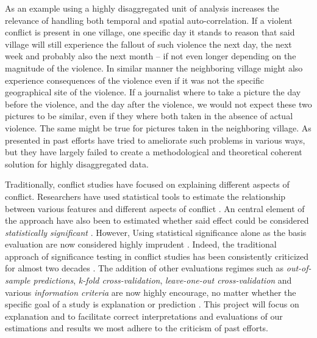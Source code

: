 \documentclass[a4paper]{article}
\begin{document}
As an example using a highly disaggregated unit of analysis increases the relevance of handling both temporal and spatial auto-correlation. If a violent conflict is present in one village, one specific day it stands to reason that said village will still experience the fallout of such violence the next day, the next week and probably also the next month -- if not even longer depending on the magnitude of the violence. In similar manner the neighboring village might also experience consequences of the violence even if it was not the specific geographical site of the violence. If a journalist where to take a picture the day before the violence, and the day after the violence, we would not expect these two pictures to be similar, even if they where both taken in the absence of actual violence. The same might be true for pictures taken in the neighboring village. As presented in \cite{SPECIALE} past efforts have tried to ameliorate such problems in various ways, but they have largely failed to create a methodological and theoretical coherent solution for highly disaggregated data.\par 

Traditionally, conflict studies have focused on explaining different aspects of conflict. Researchers have used statistical tools to estimate the relationship between various features and different aspects of conflict \citep[8]{chadefaux2017conflict}. An central element of the approach have also been to estimated whether said effect could be considered \emph{statistically significant} \citep[363-364]{Ward_Greenhill_Bakke_2010}. However, Using statistical significance alone as the basis evaluation are now considered highly imprudent \citep{Ward_Greenhill_Bakke_2010, Schrodt_2014, chadefaux2017conflict}. Indeed, the traditional approach of significance testing in conflict studies has been consistently criticized for almost two decades \citep{king_zeng_2001b, Ward_Greenhill_Bakke_2010, Goldstone_2010, Schrodt_2014, chadefaux2017conflict}. The addition of other evaluations regimes such as \emph{out-of-sample predictions}, \emph{k-fold cross-validation}, \emph{leave-one-out cross-validation} and various \emph{information criteria} are now highly encourage, no matter whether the specific goal of a study is explanation or prediction \citep{Ward_Greenhill_Bakke_2010, Schrodt_2014, Mcelreath_2018}. This project will focus on explanation and to facilitate correct interpretations and evaluations of our estimations and results we most adhere to the criticism of past efforts.\par 
\end{document}
